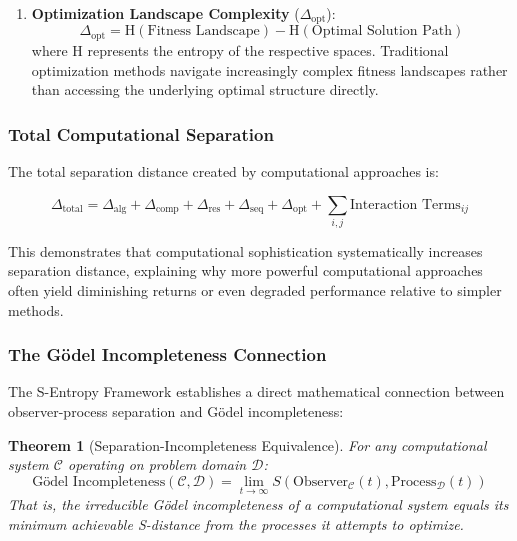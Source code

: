\documentclass[11pt]{article}
\newtheorem{theorem}{Theorem}[section]
\theoremstyle{definition}
\theoremstyle{remark}
\begin{document}
\begin{enumerate}
\item \textbf{Optimization Landscape Complexity} ($\Delta_{\text{opt}}$):
\begin{equation}
\Delta_{\text{opt}} = \text{H}(\text{Fitness Landscape}) - \text{H}(\text{Optimal Solution Path})
\end{equation}
where H represents the entropy of the respective spaces. Traditional optimization methods navigate increasingly complex fitness landscapes rather than accessing the underlying optimal structure directly.
\end{enumerate}

\subsubsection{Total Computational Separation}

The total separation distance created by computational approaches is:

\begin{equation}
\Delta_{\text{total}} = \Delta_{\text{alg}} + \Delta_{\text{comp}} + \Delta_{\text{res}} + \Delta_{\text{seq}} + \Delta_{\text{opt}} + \sum_{i,j} \text{Interaction Terms}_{ij}
\label{eq:total_computational_separation}
\end{equation}

This demonstrates that computational sophistication systematically increases separation distance, explaining why more powerful computational approaches often yield diminishing returns or even degraded performance relative to simpler methods.

\subsubsection{The Gödel Incompleteness Connection}

The S-Entropy Framework establishes a direct mathematical connection between observer-process separation and Gödel incompleteness:

\begin{theorem}[Separation-Incompleteness Equivalence]
\label{thm:separation_incompleteness}
For any computational system $\mathcal{C}$ operating on problem domain $\mathcal{D}$:
\begin{equation}
\text{Gödel Incompleteness}(\mathcal{C}, \mathcal{D}) = \lim_{t \to \infty} S(\text{Observer}_\mathcal{C}(t), \text{Process}_\mathcal{D}(t))
\end{equation}
That is, the irreducible Gödel incompleteness of a computational system equals its minimum achievable S-distance from the processes it attempts to optimize.
\end{theorem}
\end{document}
